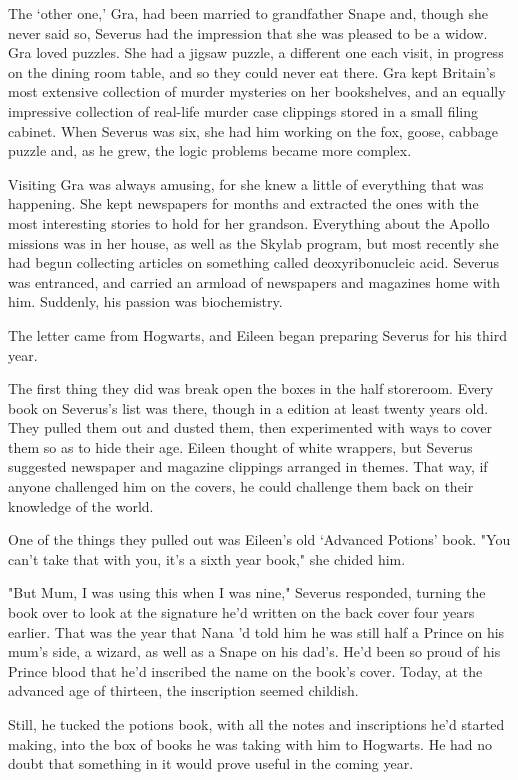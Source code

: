 The `other one,' Gra, had been married to grandfather Snape and, though she never said so, Severus had the impression that she was pleased to be a widow. Gra loved puzzles. She had a jigsaw puzzle, a different one each visit, in progress on the dining room table, and so they could never eat there. Gra kept Britain's most extensive collection of murder mysteries on her bookshelves, and an equally impressive collection of real-life murder case clippings stored in a small filing cabinet. When Severus was six, she had him working on the fox, goose, cabbage puzzle and, as he grew, the logic problems became more complex.

Visiting Gra was always amusing, for she knew a little of everything that was happening. She kept newspapers for months and extracted the ones with the most interesting stories to hold for her grandson. Everything about the Apollo missions was in her house, as well as the Skylab program, but most recently she had begun collecting articles on something called deoxyribonucleic acid. Severus was entranced, and carried an armload of newspapers and magazines home with him. Suddenly, his passion was biochemistry.

The letter came from Hogwarts, and Eileen began preparing Severus for his third year.

The first thing they did was break open the boxes in the half storeroom. Every book on Severus's list was there, though in a edition at least twenty years old. They pulled them out and dusted them, then experimented with ways to cover them so as to hide their age. Eileen thought of white wrappers, but Severus suggested newspaper and magazine clippings arranged in themes. That way, if anyone challenged him on the covers, he could challenge them back on their knowledge of the world.

One of the things they pulled out was Eileen's old `Advanced Potions' book. "You can't take that with you, it's a sixth year book," she chided him.

"But Mum, I was using this when I was nine," Severus responded, turning the book over to look at the signature he'd written on the back cover four years earlier. That was the year that Nana 'd told him he was still half a Prince on his mum's side, a wizard, as well as a Snape on his dad's. He'd been so proud of his Prince blood that he'd inscribed the name on the book's cover. Today, at the advanced age of thirteen, the inscription seemed childish.

Still, he tucked the potions book, with all the notes and inscriptions he'd started making, into the box of books he was taking with him to Hogwarts. He had no doubt that something in it would prove useful in the coming year.

